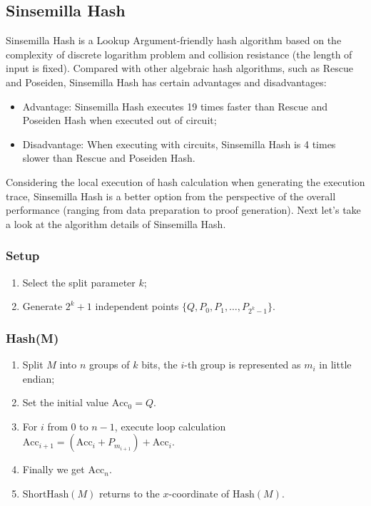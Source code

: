 \subsection{Sinsemilla Hash}

Sinsemilla Hash is a Lookup Argument-friendly hash algorithm based on the complexity of discrete logarithm problem and collision resistance (the length of input is fixed). Compared with other algebraic hash algorithms, such as Rescue and Poseiden, Sinsemilla Hash has certain advantages and disadvantages:
\begin{itemize}
    \item Advantage: Sinsemilla Hash executes 19 times faster than Rescue and Poseiden Hash when executed out of circuit;
    \item Disadvantage: When executing with circuits, Sinsemilla Hash is 4 times slower than Rescue and Poseiden Hash.
\end{itemize}
Considering the local execution of hash calculation when generating the execution trace, Sinsemilla Hash is a better option from the perspective of the overall performance (ranging from data preparation to proof generation). Next let's take a look at the algorithm details of Sinsemilla Hash.

\subsubsection{Setup}

\begin{enumerate}
    \item Select the split parameter $k$;
    \item Generate $2^k+1$ independent points $\{Q, P_0, P_1, \ldots, P_{2^k-1}\}$.
\end{enumerate}

\subsubsection{Hash(M)}

\begin{enumerate}
    \item Split $M$ into $n$ groups of $k$ bits, the $i$-th group is represented as $m_i$ in little endian;
    \item Set the initial value $\mathrm{Acc}_0 = Q$.
    \item For $i$ from 0 to $n-1$, execute loop calculation $\mathrm{Acc}_{i+1} = (\mathrm{Acc}_i + P_{m_{i+1}}) + \mathrm{Acc}_i$.
    \item Finally we get $\mathrm{Acc}_n$.
    \item $\mathrm{ShortHash}(M)$ returns to the $x$-coordinate of $\mathrm{Hash}(M)$.
\end{enumerate}


